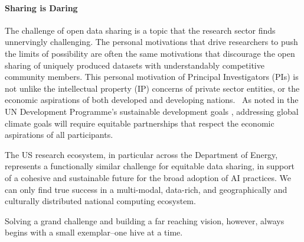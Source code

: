\paragraph{Sharing is Daring}
The challenge of open data sharing is a topic that the research sector finds unnervingly challenging. 
The personal motivations that drive researchers to push the limits of possibility are often the same motivations that discourage the open sharing of uniquely produced datasets with understandably competitive community members. 
This personal motivation of Principal Investigators (PIs) is not unlike the intellectual property (IP) concerns of private sector entities, or the economic aspirations of both developed and developing nations.  
As noted in the UN Development Programme's sustainable development goals \cite{SDGs}, addressing global climate goals will require equitable partnerships that respect the economic aspirations of all participants.

The US research ecosystem, in particular across the Department of Energy, represents a functionally similar challenge for equitable data sharing, in support of a cohesive and sustainable future for the broad adoption of AI practices. 
We can only find true success in a multi-modal, data-rich, and geographically and culturally distributed national computing ecosystem. 

Solving a grand challenge and building a far reaching vision, however, always begins with a small exemplar--one hive at a time.



